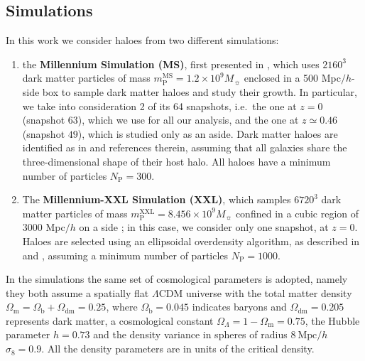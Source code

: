 \documentclass[a4paper,fleqn,usenatbib]{mnras}
\begin{document}
\subsection{Simulations}
\label{subsec:sim}
In this work we consider haloes from two different simulations: 
\begin{enumerate}
\item the \textbf{Millennium Simulation (MS)}, first presented in \citet{Springeletal2005}, which uses $2160^3$ dark matter particles of mass $m_{\mathrm{P}}^{\mathrm{MS}} =1.2 \times 10^9 M_{\sun}$ enclosed in a 500 Mpc$/h$-side box to sample dark matter haloes and study their growth. In particular, we take into consideration 2 of its 64 snapshots, i.e.\ the one at $z = 0$ (snapshot $63$), which we use for all our analysis, and the one at $z \simeq 0.46$ (snapshot $49$), which is studied only as an aside. Dark matter haloes are identified as in \citet{Joachimietal2013a} and references therein, assuming that all galaxies share the three-dimensional shape of their host halo. All haloes have a minimum number of particles $N_{\mathrm{P}} = 300$.
\item The \textbf{Millennium-XXL Simulation (XXL)}, which samples $6720^3$ dark matter particles of mass $m_{\mathrm{P}}^{\mathrm{XXL}} = 8.456 \times 10^9 M_{\sun}$ confined in a cubic region of $3000$ Mpc$/h$ on a side \citep{Anguloetal2012}; in this case, we consider only one snapshot, at $z = 0$. Haloes are selected using an ellipsoidal overdensity algorithm, as described in \citet{Despalietal2013} and \citet{Bonamigoetal2015}, assuming a minimum number of particles $N_{\mathrm{P}} = 1000$.
\end{enumerate} 

In the simulations the same set of cosmological parameters is adopted, namely they both assume a spatially flat $\Lambda$CDM universe with the total matter density $\Omega_{\mathrm{m}} = \Omega_{\mathrm{b}} + \Omega_{\mathrm{dm}} = 0.25$, where $\Omega _{\mathrm{b}} = 0.045$ indicates baryons and $\Omega_{\mathrm{dm}} = 0.205$ represents dark matter, a cosmological constant $\Omega_{\Lambda} = 1 - \Omega_{\mathrm{m}} = 0.75$, the Hubble parameter $h = 0.73$ and the density variance in spheres of radius $8 \ \mbox{Mpc}/h$ $\sigma_8 = 0.9$. All the density parameters are in units of the critical density.
\end{document}

